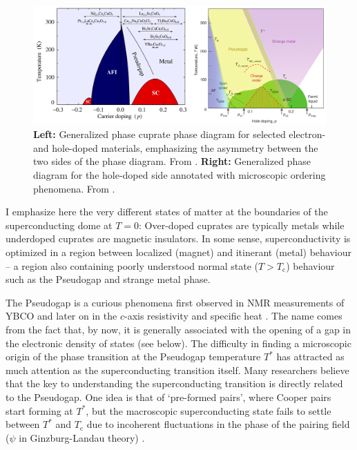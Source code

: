 \begin{figure}
    \centering
    \includegraphics[width=\textwidth]{fig/intro/keimer.png}
    \caption[cuprate phase diagrams]{\textbf{Left:} Generalized phase cuprate phase diagram for selected electron- and hole-doped materials, emphasizing the asymmetry between the two sides of the phase diagram. From \cite{Peets2007}. \textbf{Right:} Generalized phase diagram for the hole-doped side annotated with microscopic ordering phenomena. From \cite{Keimer2015}.}
    \label{fig:cuprate_phase_keimer}
\end{figure}

I emphasize here the very different states of matter at the boundaries of the superconducting dome at $T=0$: Over-doped cuprates are typically metals while underdoped cuprates are magnetic insulators. In some sense, superconductivity is optimized in a region between localized (magnet) and itinerant (metal) behaviour -- a region also containing poorly understood normal state ($T > T_\text{c}$) behaviour such as the Pseudogap and strange metal phase.

The Pseudogap is a curious phenomena first observed in NMR measurements of YBCO \cite{Alloul1989} and later on in the $c$-axis resistivity \cite{Homes1993} and specific heat \cite{Loram1993}. The name comes from the fact that, by now, it is generally associated with the opening of a gap in the electronic density of states (see below). The difficulty in finding a microscopic origin of the phase transition at the Pseudogap temperature $T^*$ has attracted as much attention as the superconducting transition itself. Many researchers believe that the key to understanding the superconducting transition is directly related to the Pseudogap. One idea is that of `pre-formed pairs', where Cooper pairs start forming at $T^*$, but the macroscopic superconducting state fails to settle between $T^*$ and $T_\text{c}$ due to incoherent fluctuations in the phase of the pairing field ($\psi$ in Ginzburg-Landau theory) \cite{Emery1995, Curty2003}.

